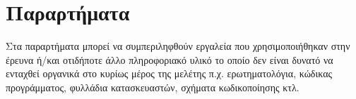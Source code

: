 \documentclass[../main.tex]{subfiles}
\begin{document}
\section{Παραρτήματα}


Στα παραρτήματα μπορεί να συμπεριληφθούν εργαλεία που χρησιμοποιήθηκαν στην έρευνα ή/και οτιδήποτε άλλο πληροφοριακό υλικό το οποίο δεν είναι δυνατό να ενταχθεί οργανικά στο κυρίως μέρος της μελέτης π.χ. ερωτηματολόγια, κώδικας προγράμματος, φυλλάδια κατασκευαστών, σχήματα κωδικοποίησης  κτλ.

\clearpage
\end{document}
